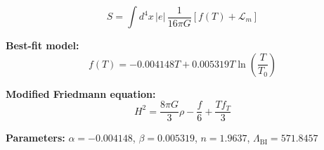
\begin{equation}
  S = \int d^4x \, |e| \, \frac{1}{16\pi G} \left[ f(T) + \mathcal{L}_m \right]
\end{equation}

\textbf{Best-fit model:}
\begin{equation}
  f(T) = -0.004148 T + 0.005319 T \ln\!\left(\frac{T}{T_0}\right)
\end{equation}

\textbf{Modified Friedmann equation:}
\begin{equation}
  H^2 = \frac{8\pi G}{3} \rho - \frac{f}{6} + \frac{T f_T}{3}
\end{equation}

\textbf{Parameters:}
$\alpha = -0.004148$, \quad
$\beta = 0.005319$, \quad
$n = 1.9637$, \quad
$\Lambda_{\text{BI}} = 571.8457$